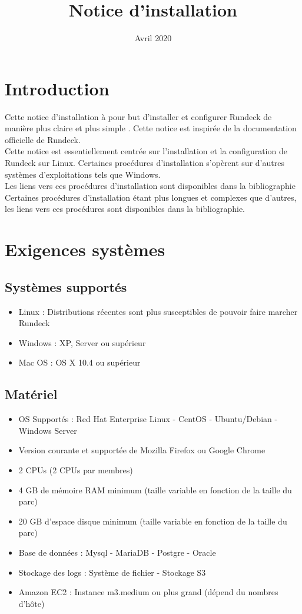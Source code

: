 \documentclass[12pt]{article}
\title{Notice d'installation}
\date{Avril 2020}
\begin{document}
\maketitle
\newpage
\tableofcontents
\newpage

\section{Introduction}
Cette notice d'installation à pour but d'installer et configurer Rundeck de manière plus claire et plus simple . Cette notice est inspirée de la documentation officielle de Rundeck.
\\
Cette notice est essentiellement centrée sur l'installation et la configuration de Rundeck sur Linux. Certaines procédures d'installation s'opèrent sur d'autres systèmes d'exploitations tels que Windows.
\\
Les liens vers ces procédures d'installation sont disponibles dans la bibliographie
\\
Certaines procédures d'installation étant plus longues et complexes que d'autres, les liens vers ces procédures sont disponibles dans la bibliographie.

\section{Exigences systèmes}
\subsection{Systèmes supportés}
\begin{itemize}
    \item Linux : Distributions récentes sont plus susceptibles de pouvoir faire marcher Rundeck
    \item Windows : XP, Server ou supérieur
    \item Mac OS : OS X 10.4 ou supérieur   
\end{itemize}
    
\subsection{Matériel}
\begin{itemize}
    \item OS Supportés : Red Hat Enterprise Linux - CentOS - Ubuntu/Debian - Windows Server
    \item Version courante et supportée de Mozilla Firefox ou Google Chrome
    \item 2 CPUs (2 CPUs par membres)
    \item 4 GB de mémoire RAM minimum (taille variable en fonction de la taille du parc)
    \item 20 GB d'espace disque minimum (taille variable en fonction de la taille du parc)
    \item Base de données : Mysql - MariaDB - Postgre - Oracle
    \item Stockage des logs : Système de fichier - Stockage S3
    \item Amazon EC2 : Instance m3.medium ou plus grand (dépend du nombres d'hôte) 
\end{itemize}
\end{document}
